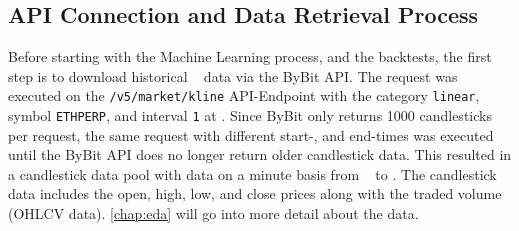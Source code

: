 \subsection{API Connection and Data Retrieval Process}
\label{chap:api-connection}

Before starting with the Machine Learning process, and the backtests, the first step is to download historical \ethusdc~ data via the ByBit API.
The request was executed on the \texttt{/v5/market/kline} API-Endpoint \cite{bybit-api-doc-get-kline} with the category \texttt{linear}, symbol \texttt{ETHPERP}, and interval \texttt{1} at \ethDataEndDate.
Since ByBit only returns 1000 candlesticks per request, the same request with different start-, and end-times was executed until the ByBit API does no longer return older candlestick data.
This resulted in a candlestick data pool with data on a minute basis from \ethDataStartDate~ to \ethDataEndDate.
The candlestick data includes the open, high, low, and close prices along with the traded volume (OHLCV data).
\autoref{chap:eda} will go into more detail about the data.